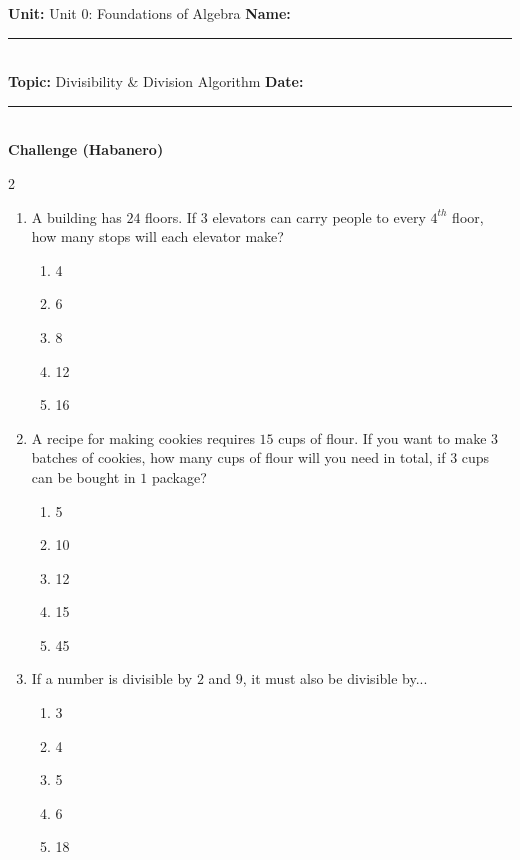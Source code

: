 \documentclass[10pt]{article}
\begin{document}
\enlargethispage{2.5cm}

\begin{tcolorbox}[colback=mainblue!5, colframe=mainblue, sharp corners, boxrule=0.5pt]
    \small \textbf{Unit:} Unit 0: Foundations of Algebra \hfill \textbf{Name:} \rule{3cm}{0.4pt} \\
    \small \textbf{Topic:} Divisibility & Division Algorithm \hfill \textbf{Date:} \rule{2cm}{0.4pt} \\
    \centering \textbf{\large Challenge (Habanero)}
\end{tcolorbox}

\vspace{0.2cm}

\begin{multicols}{2}
\begin{enumerate}[label=\textbf{Q\arabic*.}, leftmargin=*, itemsep=6pt, parsep=0pt]

  \item \small A building has $24$ floors. If $3$ elevators can carry people to every $4^{th}$ floor, how many stops will each elevator make?
  \begin{enumerate}[label=(\Alph*), leftmargin=0.6cm, nosep, itemsep=2pt]
    \item 4
    \item 6
    \item 8
    \item 12
    \item 16
  \end{enumerate}

  \item \small A recipe for making cookies requires $15$ cups of flour. If you want to make $3$ batches of cookies, how many cups of flour will you need in total, if $3$ cups can be bought in $1$ package?
  \begin{enumerate}[label=(\Alph*), leftmargin=0.6cm, nosep, itemsep=2pt]
    \item 5
    \item 10
    \item 12
    \item 15
    \item 45
  \end{enumerate}

  \item \small If a number is divisible by $2$ and $9$, it must also be divisible by...
  \begin{enumerate}[label=(\Alph*), leftmargin=0.6cm, nosep, itemsep=2pt]
    \item 3
    \item 4
    \item 5
    \item 6
    \item 18
  \end{enumerate}


\end{enumerate}
\end{multicols}
\end{document}
